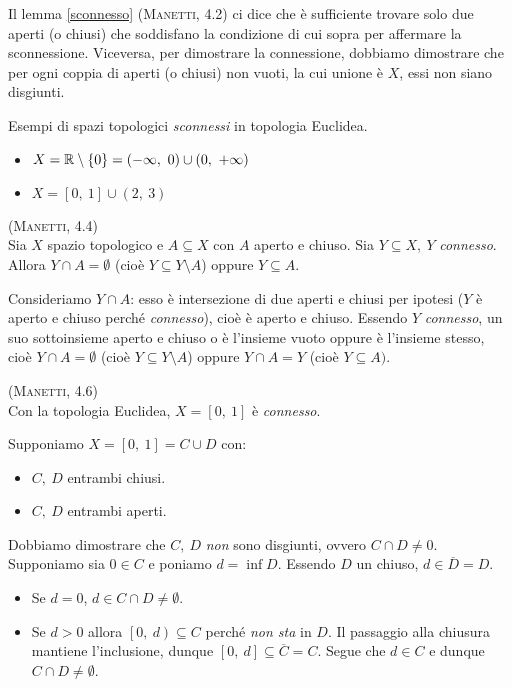 \begin{observe}
	Il lemma \ref{sconnesso} \textsc{(Manetti, 4.2)} ci dice che è sufficiente trovare solo due aperti (o chiusi) che soddisfano la condizione di cui sopra per affermare la sconnessione. Viceversa, per dimostrare la connessione, dobbiamo dimostrare che per ogni coppia di aperti (o chiusi) non vuoti, la cui unione è $X$, essi non siano disgiunti.
\end{observe}
\begin{examples} Esempi di spazi topologici \textit{sconnessi} in topologia Euclidea.
	\begin{itemize}
		\item $X=\realset\setminus\left\{0\right\}=\left(-\infty,\ 0\right)\cup \left(0,\ +\infty\right)$
		\item $X=\left[0,\ 1\right]\cup \left(2,\ 3\right)$
	\end{itemize}
\end{examples}
\begin{lemming}\textsc{(Manetti, 4.4)}\\
	Sia $X$ spazio topologico e $A\subseteq X$ con $A$ aperto e chiuso. Sia $Y\subseteq X,\ Y$ \textit{connesso}. Allora $Y\cap A=\emptyset$ (cioè $Y\subseteq Y\setminus A$) oppure $Y\subseteq A$. 
\end{lemming}
\begin{demonstration}
	Consideriamo $Y\cap A$: esso è intersezione di due aperti e chiusi per ipotesi ($Y$ è aperto e chiuso perché \textit{connesso}), cioè è aperto e chiuso. Essendo $Y$ \textit{connesso}, un suo sottoinsieme aperto e chiuso o è l'insieme vuoto oppure è l'insieme stesso, cioè $Y\cap A=\emptyset$ (cioè $Y\subseteq Y\setminus A$) oppure $Y\cap A=Y$ (cioè $Y\subseteq A)$.
\end{demonstration}
\begin{theorema}\textsc{(Manetti, 4.6)}\\
	Con la topologia Euclidea, $X=\left[0,\ 1\right]$ è \textit{connesso}.
\end{theorema}
\begin{demonstration}
	Supponiamo $X=\left[0,\ 1\right]=C\cup D$ con:
	\begin{itemize}
		\item $C,\ D$ entrambi chiusi.
		\item $C,\ D$ entrambi aperti.
	\end{itemize}
	Dobbiamo dimostrare che $C,\ D$ \textit{non} sono disgiunti, ovvero $C\cap D\neq 0$. Supponiamo sia $0\in C$ e poniamo $d=\inf D$. Essendo $D$ un chiuso, $d\in \overline{D}=D$.
	\begin{itemize}
		\item Se $d=0$, $d\in C\cap D\neq \emptyset$.
		\item Se $d>0$ allora $\left[0,\ d\right)\subseteq C$ perché \textit{non sta} in $D$. Il passaggio alla chiusura mantiene l'inclusione, dunque $\left[0,\ d\right]\subseteq \overline{C}=C$. Segue che $d\in C$ e dunque $C\cap D\neq \emptyset$.
	\end{itemize}
\end{demonstration}
